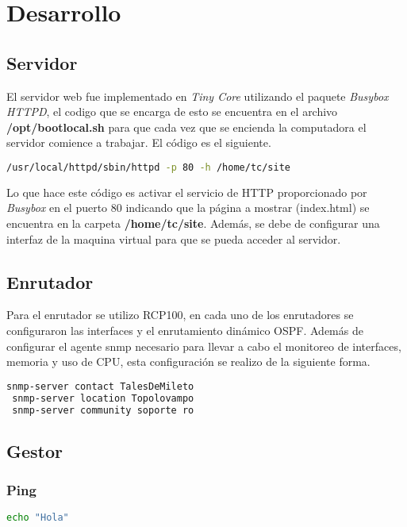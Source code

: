 \documentclass[a4paper,12pt]{article}
\begin{document}
\section{Desarrollo}
\subsection{Servidor}
El servidor web fue implementado en \emph{Tiny Core} utilizando el paquete \emph{Busybox HTTPD}, el codigo que se encarga de esto se encuentra en el archivo \textbf{/opt/bootlocal.sh} para que cada vez que se encienda la computadora el servidor comience a trabajar. El código es el siguiente.

\begin{lstlisting}[language=bash]
 /usr/local/httpd/sbin/httpd -p 80 -h /home/tc/site
\end{lstlisting}
Lo que hace este código es activar el servicio de HTTP proporcionado por \emph{Busybox} en el puerto 80 indicando que la página a mostrar (index.html) se encuentra en la carpeta \textbf{/home/tc/site}.
Además, se debe de configurar una interfaz de la maquina virtual para que se pueda acceder al servidor.
\subsection{Enrutador}
Para el enrutador se utilizo RCP100, en cada uno de los enrutadores se configuraron las interfaces y el enrutamiento dinámico OSPF. Además de configurar el agente snmp necesario para llevar a cabo el monitoreo de interfaces, memoria y uso de CPU, esta configuración se realizo de la siguiente forma.
\begin{lstlisting}[language=bash]
 snmp-server contact TalesDeMileto
 snmp-server location Topolovampo
 snmp-server community soporte ro
\end{lstlisting}
\subsection{Gestor}
\subsubsection{Ping}
\begin{lstlisting}[language=bash]
 echo "Hola"
\end{lstlisting}
\end{document}
